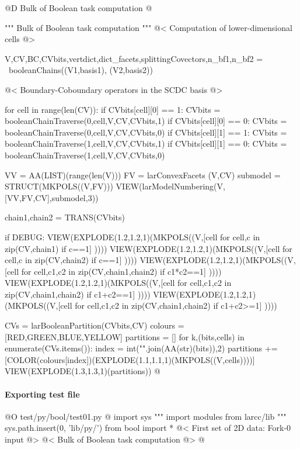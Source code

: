 \documentclass[11pt,oneside]{article}	%
\begin{document}
@D Bulk of Boolean task computation
@{""" Bulk of Boolean task computation """
@< Computation of lower-dimensional cells @>

V,CV,BC,CVbits,vertdict,dict_facets,splittingCovectors,n_bf1,n_bf2 = \
	booleanChains((V1,basis1), (V2,basis2))
	
@< Boundary-Coboundary operators in the SCDC basis @>

for cell in range(len(CV)):
	if CVbits[cell][0] == 1:
		CVbits = booleanChainTraverse(0,cell,V,CV,CVbits,1)		
	if CVbits[cell][0] == 0:
		CVbits = booleanChainTraverse(0,cell,V,CV,CVbits,0)
	if CVbits[cell][1] == 1:
		CVbits = booleanChainTraverse(1,cell,V,CV,CVbits,1)
	if CVbits[cell][1] == 0:
		CVbits = booleanChainTraverse(1,cell,V,CV,CVbits,0)

VV = AA(LIST)(range(len(V)))
FV = larConvexFacets (V,CV)
submodel = STRUCT(MKPOLS((V,FV)))
VIEW(larModelNumbering(V,[VV,FV,CV],submodel,3))

chain1,chain2 = TRANS(CVbits)

if DEBUG:
	VIEW(EXPLODE(1.2,1.2,1)(MKPOLS((V,[cell for cell,c in zip(CV,chain1) if c==1] ))))
	VIEW(EXPLODE(1.2,1.2,1)(MKPOLS((V,[cell for cell,c in zip(CV,chain2) if c==1] ))))
	VIEW(EXPLODE(1.2,1.2,1)(MKPOLS((V,[cell for cell,c1,c2 in zip(CV,chain1,chain2) if c1*c2==1] ))))
	VIEW(EXPLODE(1.2,1.2,1)(MKPOLS((V,[cell for cell,c1,c2 in zip(CV,chain1,chain2) if c1+c2==1] ))))
	VIEW(EXPLODE(1.2,1.2,1)(MKPOLS((V,[cell for cell,c1,c2 in zip(CV,chain1,chain2) if c1+c2>=1] ))))
	
CVs = larBooleanPartition(CVbits,CV)
colours = [RED,GREEN,BLUE,YELLOW]
partitions = []
for k,(bits,cells) in enumerate(CVs.items()):
	index = int("".join(AA(str)(bits)),2)
	partitions += [COLOR(colours[index])(EXPLODE(1.1,1.1,1)(MKPOLS((V,cells))))]
VIEW(EXPLODE(1.3,1.3,1)(partitions))
@}

\paragraph{Exporting test file}

@O test/py/bool/test01.py
@{
import sys
""" import modules from larcc/lib """
sys.path.insert(0, 'lib/py/')
from bool import *
@< First set of 2D data: Fork-0 input @>
@< Bulk of Boolean task computation @>
@}
\end{document}
